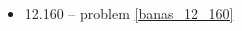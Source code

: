 \begin{multicols}{3}
\begin{itemize}
    \item 12.160 -- problem \ref{banas_12_160}

\end{itemize}
\end{multicols}
